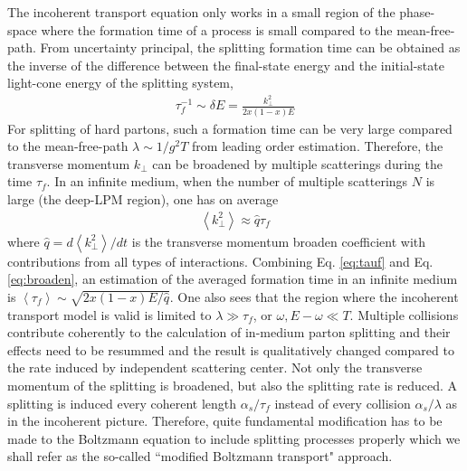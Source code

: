 \documentclass[aps, prc, reprint, amsmath, groupedaddress, nofootinbib]{revtex4-1}
\begin{document}
The incoherent transport equation only works in a small region of the phase-space where the formation time of a process is small compared to the mean-free-path.
From uncertainty principal, the splitting formation time can be obtained as the inverse of the difference between the final-state energy and the initial-state light-cone energy of the splitting system,
\begin{eqnarray}
\tau_f^{-1} \sim \delta E = \frac{k_\perp^2}{2x(1-x)E} 
\label{eq:tauf}
\end{eqnarray}
For splitting of hard partons, such a formation time can be very large compared to the mean-free-path $\lambda \sim 1/g^2T$ from leading order estimation.
Therefore, the transverse momentum $k_\perp$ can be broadened by multiple scatterings during the time $\tau_f$.
In an infinite medium, when the number of multiple scatterings $N$ is large (the deep-LPM region), one has on average
\begin{eqnarray}
\left\langle k_\perp^2 \right\rangle \approx \hat{q} \tau_f \label{eq:broaden}
\end{eqnarray}
where $\hat{q} = d \left\langle k_\perp^2 \right\rangle / dt$ is the transverse momentum broaden coefficient with contributions from all types of interactions.
Combining Eq. \ref{eq:tauf} and Eq. \ref{eq:broaden}, an estimation of the averaged formation time in an infinite medium is $\left\langle \tau_f \right\rangle \sim \sqrt{2x(1-x)E/\hat{q}}$.
One also sees that the region where the incoherent transport model is valid is limited to $\lambda \gg \tau_f$, or $\omega, E-\omega \ll T$.
Multiple collisions contribute coherently to the calculation of in-medium parton splitting and their effects need to be resummed and the result is qualitatively changed compared to the rate induced by independent scattering center.
Not only the transverse momentum of the splitting is broadened, but also the splitting rate is reduced. 
A splitting is induced every coherent length $\alpha_s/\tau_f$ instead of every collision $\alpha_s/\lambda$ as in the incoherent picture.
Therefore, quite fundamental modification has to be made to the Boltzmann equation to include splitting processes properly which we shall refer as the so-called ``modified Boltzmann transport" approach.
\end{document}
